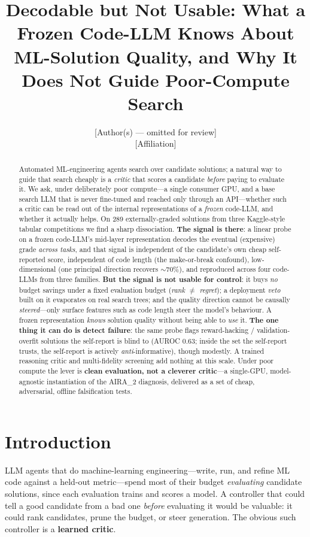 \documentclass[10pt]{article}
\title{\bfseries Decodable but Not Usable: What a Frozen Code-LLM Knows About\\
ML-Solution Quality, and Why It Does Not Guide Poor-Compute Search}
\author{[Author(s) --- omitted for review]\\[2pt]\small [Affiliation]}
\date{}
\begin{document}
\maketitle

\begin{abstract}
\noindent
Automated ML-engineering agents search over candidate solutions; a natural way to guide that search cheaply is a \emph{critic} that scores a candidate \emph{before} paying to evaluate it. We ask, under deliberately poor compute---a single consumer GPU, and a base search LLM that is never fine-tuned and reached only through an API---whether such a critic can be read out of the internal representations of a \emph{frozen} code-LLM, and whether it actually helps. On 289 externally-graded solutions from three Kaggle-style tabular competitions we find a sharp dissociation. \textbf{The signal is there}: a linear probe on a frozen code-LLM's mid-layer representation decodes the eventual (expensive) grade \emph{across tasks}, and that signal is independent of the candidate's own cheap self-reported score, independent of code length (the make-or-break confound), low-dimensional (one principal direction recovers ${\sim}70\%$), and reproduced across four code-LLMs from three families. \textbf{But the signal is not usable for control}: it buys \emph{no} budget savings under a fixed evaluation budget (\emph{rank $\neq$ regret}); a deployment \emph{veto} built on it evaporates on real search trees; and the quality direction cannot be causally \emph{steered}---only surface features such as code length steer the model's behaviour. A frozen representation \emph{knows} solution quality without being able to \emph{use} it. \textbf{The one thing it can do is detect failure}: the same probe flags reward-hacking / validation-overfit solutions the self-report is blind to (AUROC 0.63; inside the set the self-report trusts, the self-report is actively \emph{anti}-informative), though modestly. A trained reasoning critic and multi-fidelity screening add nothing at this scale. Under poor compute the lever is \textbf{clean evaluation, not a cleverer critic}---a single-GPU, model-agnostic instantiation of the AIRA\_2 diagnosis, delivered as a set of cheap, adversarial, offline falsification tests.
\end{abstract}

\section{Introduction}
LLM agents that do machine-learning engineering---write, run, and refine ML code against a held-out metric---spend most of their budget \emph{evaluating} candidate solutions, since each evaluation trains and scores a model. A controller that could tell a good candidate from a bad one \emph{before} evaluating it would be valuable: it could rank candidates, prune the budget, or steer generation. The obvious such controller is a \textbf{learned critic}.
\end{document}
